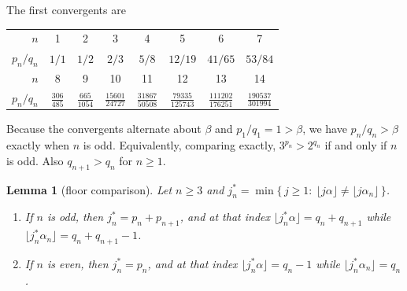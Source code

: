 \documentclass[11pt,reqno]{amsart}
\theoremstyle{plain}
\newtheorem{lemma}[theorem]{Lemma}
\theoremstyle{definition}
\begin{document}
\noindent The first convergents are
\begin{center}\footnotesize\setlength{\tabcolsep}{3.5pt}
\begin{tabular}{@{}r*{7}{c}@{}}
\toprule
$n$ & 1 & 2 & 3 & 4 & 5 & 6 & 7\\
$p_n/q_n$ & $1/1$ & $1/2$ & $2/3$ & $5/8$ & $12/19$ & $41/65$ & $53/84$\\
\midrule
$n$ & 8 & 9 & 10 & 11 & 12 & 13 & 14\\
$p_n/q_n$ & $\frac{306}{485}$ & $\frac{665}{1054}$ & $\frac{15601}{24727}$ &
$\frac{31867}{50508}$ & $\frac{79335}{125743}$ & $\frac{111202}{176251}$ &
$\frac{190537}{301994}$\\
\bottomrule
\end{tabular}
\end{center}

Because the convergents alternate about $\beta$ and $p_1/q_1=1>\beta$, we have
$p_n/q_n>\beta$ exactly when $n$ is odd. Equivalently, comparing exactly,
$3^{p_n}>2^{q_n}$ if and only if $n$ is odd. Also $q_{n+1}>q_n$ for $n\ge1$.

\begin{lemma}[floor comparison]\label{lem:floor}
Let $n\ge 3$ and $j^{*}_n=\min\{\,j\ge1:\ \lfloor j\alpha\rfloor\ne\lfloor
j\alpha_n\rfloor\,\}$.
\begin{enumerate}
\item If $n$ is odd, then $j^{*}_n=p_n+p_{n+1}$, and at that index
$\lfloor j^{*}_n\alpha\rfloor=q_n+q_{n+1}$ while
$\lfloor j^{*}_n\alpha_n\rfloor=q_n+q_{n+1}-1$.
\item If $n$ is even, then $j^{*}_n=p_n$, and at that index
$\lfloor j^{*}_n\alpha\rfloor=q_n-1$ while
$\lfloor j^{*}_n\alpha_n\rfloor=q_n$.
\end{enumerate}
\end{lemma}
\end{document}
